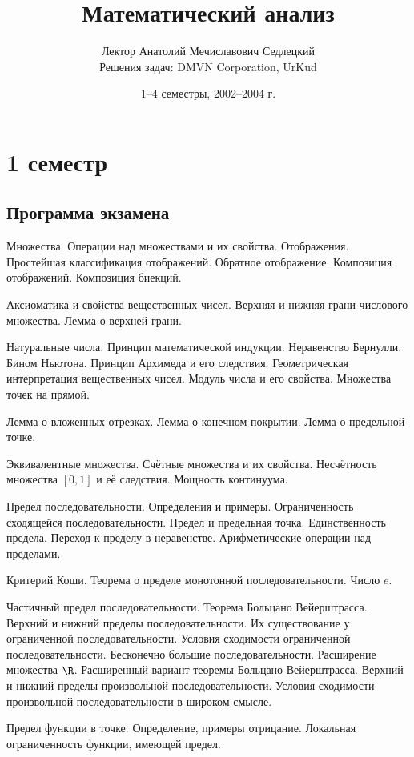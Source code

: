 \documentclass[a4paper]{article}
\title{Математический анализ}
\author{Лектор Анатолий Мечиславович Седлецкий\\
{\footnotesize Решения задач: DMVN Corporation, UrKud}}
\date{1--4 семестры, 2002--2004 г.}
\begin{document}
\maketitle

\section{1 семестр}

\subsection{Программа экзамена}

\begin{nums}{-2}
\item Множества. Операции над множествами и их свойства. Отображения. Простейшая классификация отображений.
Обратное отображение. Композиция отображений. Композиция биекций.
\item Аксиоматика и свойства вещественных чисел. Верхняя и нижняя грани числового множества. Лемма о верхней грани.
\item Натуральные числа. Принцип математической индукции. Неравенство Бернулли. Бином Ньютона.
Принцип Архимеда и его следствия. Геометрическая интерпретация вещественных чисел. Модуль числа и его свойства.
Множества точек на прямой.
\item Лемма о вложенных отрезках. Лемма о конечном покрытии. Лемма о предельной точке.
\item Эквивалентные множества. Счётные множества и их свойства. Несчётность множества $[0,1]$ и её следствия.
Мощность континуума.
\item Предел последовательности. Определения и примеры. Ограниченность сходящейся последовательности.
Предел и предельная точка. Единственность предела. Переход к пределу в неравенстве. Арифметические операции
над пределами.
\item Критерий Коши. Теорема о пределе монотонной последовательности. Число $e$.
\item Частичный предел последовательности. Теорема Больцано Вейерштрасса. Верхний и нижний пределы последовательности.
Их существование у ограниченной последовательности. Условия сходимости ограниченной последовательности. Бесконечно
большие последовательности. Расширение множества $\R$. Расширенный вариант теоремы Больцано Вейерштрасса. Верхний
и нижний пределы произвольной последовательности. Условия сходимости произвольной последовательности в широком смысле.
\item Предел функции в точке. Определение, примеры отрицание. Локальная ограниченность функции, имеющей предел.

\end{nums}
\end{document}
